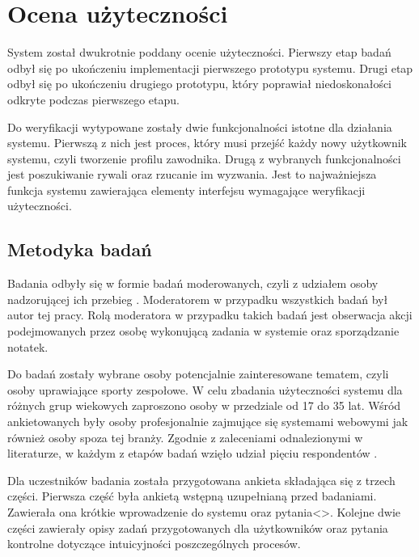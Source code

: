 \chapter{Ocena użyteczności}

System został dwukrotnie poddany ocenie użyteczności. Pierwszy etap badań odbył się po ukończeniu implementacji pierwszego prototypu systemu. Drugi etap odbył się po ukończeniu drugiego prototypu, który poprawiał niedoskonałości odkryte podczas pierwszego etapu. 

Do weryfikacji wytypowane zostały dwie funkcjonalności istotne dla działania systemu. Pierwszą z nich jest proces, który musi przejść każdy nowy użytkownik systemu, czyli tworzenie profilu zawodnika. Drugą z wybranych funkcjonalności jest poszukiwanie rywali oraz rzucanie im wyzwania. Jest to najważniejsza funkcja systemu zawierająca elementy interfejsu wymagające weryfikacji użyteczności.

\section{Metodyka badań}

Badania odbyły się w formie badań moderowanych, czyli z udziałem osoby nadzorującej ich przebieg \cite{usstudywhatis}. Moderatorem w przypadku wszystkich badań był autor tej pracy. Rolą moderatora w przypadku takich badań jest obserwacja akcji podejmowanych przez osobę wykonującą zadania w systemie oraz sporządzanie notatek.

Do badań zostały wybrane osoby potencjalnie zainteresowane tematem, czyli osoby uprawiające sporty zespołowe. W celu zbadania użyteczności systemu dla różnych grup wiekowych zaproszono osoby w przedziale od 17 do 35 lat. Wśród ankietowanych były osoby profesjonalnie zajmujące się systemami webowymi jak również osoby spoza tej branży. Zgodnie z zaleceniami odnalezionymi w literaturze, w każdym z etapów badań wzięło udział pięciu respondentów \cite{usabilitystudy}.

Dla uczestników badania została przygotowana ankieta składająca się z trzech części. Pierwsza część była ankietą wstępną uzupełnianą przed badaniami. Zawierała ona krótkie wprowadzenie do systemu oraz pytania<>. Kolejne dwie części zawierały opisy zadań przygotowanych dla użytkowników oraz pytania kontrolne dotyczące intuicyjności poszczególnych procesów. 

